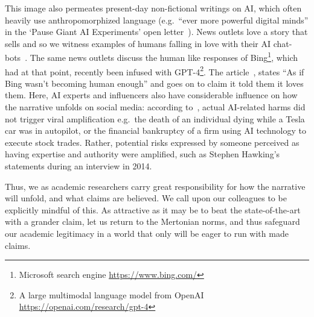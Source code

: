\documentclass{article}
\theoremstyle{plain}
\theoremstyle{definition}
\theoremstyle{remark}
\begin{document}
This image also permeates present-day non-fictional writings on AI, which often heavily use anthropomorphized language (e.g.\ ``ever more powerful digital minds'' in the `Pause Giant AI Experiments' open letter~\cite{pauseai}). News outlets love a story that sells and so we witness examples of humans falling in love with their AI chat-bots~\cite{replika,nytimesailove}. The same news outlets discuss the human like responses of Bing\footnote{Microsoft search engine \url{https://www.bing.com/}}, which had at that point, recently been infused with GPT-4\footnote{A large multimodal language model from OpenAI \url{https://openai.com/research/gpt-4}}. The article~\cite{nytimesbing}, states ``As if Bing wasn’t becoming human enough'' and goes on to claim it told them it loves them. Here, AI experts and influencers also have considerable influence on how the narrative unfolds on social media: according to~\citet{neri2020role}, actual AI-related harms did not trigger viral amplification e.g.\ the death of an individual dying while a Tesla car was in autopilot, or the financial bankruptcy of a firm using AI technology to execute stock trades. Rather, potential risks expressed by someone perceived as having expertise and authority were amplified, such as Stephen Hawking's statements during an interview in 2014.

Thus, we as academic researchers carry great responsibility for how the narrative will unfold, and what claims are believed. We call upon our colleagues to be explicitly mindful of this. As attractive as it may be to beat the state-of-the-art with a grander claim, let us return to the Mertonian norms, and thus safeguard our academic legitimacy in a world that only will be eager to run with made claims.




\end{document}

